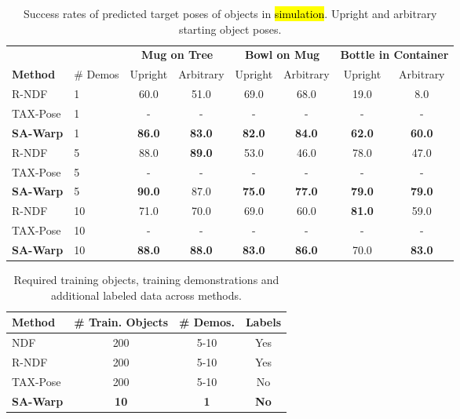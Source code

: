 \documentclass{article}
\begin{document}
\begin{table}[h]
    \centering
    \begin{tabular}{llcccccc}
        \toprule
          & & \multicolumn{2}{c}{\textbf{Mug on Tree}} & \multicolumn{2}{c}{\textbf{Bowl on Mug}} & \multicolumn{2}{c}{\textbf{Bottle in Container}} \\
         \textbf{Method} & \# Demos & Upright & Arbitrary & Upright & Arbitrary & Upright & Arbitrary \\
         \midrule
         R-NDF & 1 & 60.0 & 51.0 & 69.0 & 68.0 & 19.0 & 8.0 \\
         TAX-Pose & 1 & - & - & - & - & - & - \\
         \textbf{SA-Warp} & 1 & \textbf{86.0} & \textbf{83.0} & \textbf{82.0} & \textbf{84.0} & \textbf{62.0} & \textbf{60.0} \\
         \midrule
         R-NDF & 5 & 88.0 & \textbf{89.0} & 53.0 & 46.0 & 78.0 & 47.0 \\
         TAX-Pose & 5 & - & - & - & - & - & - \\
         \textbf{SA-Warp} & 5 & \textbf{90.0} & 87.0 & \textbf{75.0} & \textbf{77.0} & \textbf{79.0} & \textbf{79.0} \\
         \midrule
         R-NDF & 10 & 71.0 & 70.0 & 69.0 & 60.0 & \textbf{81.0} & 59.0 \\
         TAX-Pose & 10 & - & - & - & - & - & - \\
         \textbf{SA-Warp} & 10 & \textbf{88.0} & \textbf{88.0} & \textbf{83.0} & \textbf{86.0} & 70.0 & \textbf{83.0} \\
         \bottomrule
    \end{tabular}
    \caption{Success rates of predicted target poses of objects in \hl{simulation}. Upright and arbitrary starting object poses.}
    \label{tab:simulation}
\end{table}

\begin{table}[h]
    \centering
    \begin{tabular}{lccc}
        \toprule
         \textbf{Method} & \# Train. Objects & \# Demos. & Labels \\
         \midrule
         NDF & 200 & 5-10 & Yes \\
         R-NDF & 200 & 5-10 & Yes \\
         TAX-Pose & 200 & 5-10 & No \\
         \textbf{SA-Warp} & \textbf{10} & \textbf{1} & \textbf{No} \\
         \bottomrule
    \end{tabular}
    \caption{Required training objects, training demonstrations and additional labeled data across methods.}
    \label{tab:training}
\end{table}
\end{document}
